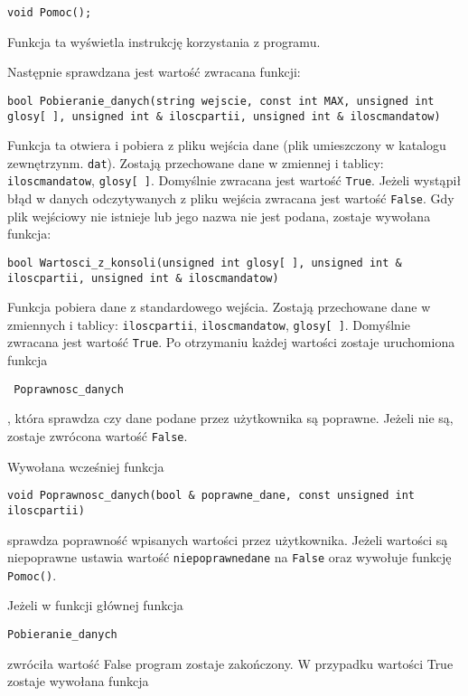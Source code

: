\documentclass[12pt,a4paper]{article}
\begin{document}
\begin{lstlisting}
void Pomoc();
\end{lstlisting} 
Funkcja ta wyświetla instrukcję korzystania z programu.

Następnie sprawdzana jest wartość zwracana funkcji: 
\begin{lstlisting}
bool Pobieranie_danych(string wejscie, const int MAX, unsigned int glosy[ ], unsigned int & iloscpartii, unsigned int & iloscmandatow)
\end{lstlisting}
Funkcja ta otwiera i pobiera z pliku wejścia dane (plik umieszczony w katalogu zewnętrzynm. \texttt{dat}). Zostają przechowane dane w zmiennej i tablicy: \texttt{iloscmandatow}, \texttt{glosy[ ]}. Domyślnie zwracana jest wartość \texttt{True}. Jeżeli wystąpił błąd w danych odczytywanych z pliku wejścia zwracana jest wartość \texttt{False}. Gdy plik wejściowy nie istnieje lub jego nazwa nie jest podana, zostaje wywołana funkcja:

\begin{lstlisting}
bool Wartosci_z_konsoli(unsigned int glosy[ ], unsigned int & iloscpartii, unsigned int & iloscmandatow)
\end{lstlisting} 

Funkcja pobiera dane z standardowego wejścia. Zostają przechowane dane w zmiennych i tablicy: \texttt{iloscpartii}, \texttt{iloscmandatow}, \texttt{glosy[ ]}. Domyślnie zwracana jest wartość \texttt{True}. Po otrzymaniu każdej wartości zostaje uruchomiona funkcja \begin{verbatim} Poprawnosc_danych \end{verbatim}, która sprawdza czy dane podane przez użytkownika są poprawne. Jeżeli nie są, zostaje zwrócona wartość \texttt{False}.

Wywołana wcześniej funkcja
\begin{lstlisting}
void Poprawnosc_danych(bool & poprawne_dane, const unsigned int iloscpartii)
\end{lstlisting} 
sprawdza poprawność wpisanych wartości przez użytkownika. Jeżeli wartości są niepoprawne ustawia wartość \texttt{niepoprawnedane} na \texttt{False} oraz wywołuje funkcję \texttt{Pomoc()}.
\newline

Jeżeli w funkcji głównej funkcja 
\begin{verbatim}
Pobieranie_danych
\end{verbatim}
zwróciła wartość False program zostaje zakończony. W przypadku wartości True zostaje wywołana funkcja
\end{document}
